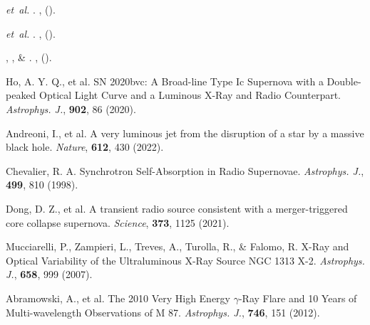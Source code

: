 \documentclass{nature_plusfigure}
\newcommand{\apj}{{Astrophys. J.}}
\newcommand{\nat}{{Nature}}
\begin{document}
\begin{thebibliography}{100}
 \emph{et~al.}
\newblock {}.
\newblock \emph{} \textbf{},
   ().

 \emph{et~al.}
\newblock {}.
\newblock \emph{} \textbf{},
   ().

, ,
   \& 
\newblock {}.
\newblock \emph{\bibinfo{journal}{\apj}} \textbf{},
   ().

 Ho, A. Y. Q., et al. SN 2020bvc: A Broad-line Type Ic Supernova with a Double-peaked Optical Light Curve and a Luminous X-Ray and Radio Counterpart. \emph{\apj}, \textbf{902}, 86 (2020). 

 Andreoni, I., et al. A very luminous jet from the disruption of a star by a massive black hole. \emph{\nat}, \textbf{612}, 430 (2022). 

 
  Chevalier, R. A. Synchrotron Self-Absorption in Radio Supernovae. \emph{\apj}, \textbf{499}, 810 (1998). 
 
   Dong, D. Z., et al. A transient radio source consistent with a merger-triggered core collapse supernova. \emph{Science}, \textbf{373}, 1125 (2021). 
  
 
 Mucciarelli, P., Zampieri, L., Treves, A., Turolla, R., \& Falomo, R. X-Ray and Optical Variability of the Ultraluminous X-Ray Source NGC 1313 X-2. \emph{\apj}, \textbf{658}, 999 (2007). 

 Abramowski, A., et al. The 2010 Very High Energy $\gamma$-Ray Flare and 10 Years of Multi-wavelength Observations of M 87. \emph{\apj}, \textbf{746}, 151 (2012). 


\end{thebibliography}
\end{document}
